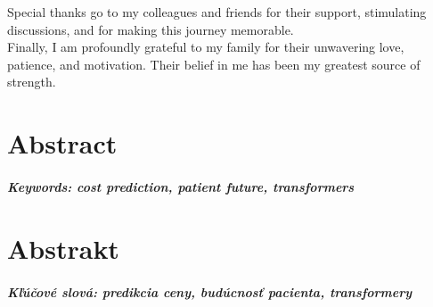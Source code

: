 \documentclass[12pt, twoside, openany]{book}
\begin{document}
Special thanks go to my colleagues and friends for their support, stimulating discussions, and for making this journey memorable.
\\

Finally, I am profoundly grateful to my family for their unwavering love, patience, and motivation. Their belief in me has been my greatest source of strength.


\vfill\eject 



\newpage 
\thispagestyle{empty}
\chapter*{Abstract}\label{chap:abstract_en}


\paragraph*{Keywords: cost prediction, patient future, transformers}  


\newpage 
\thispagestyle{empty}
\chapter*{Abstrakt}\label{chap:abstract_sk}


\paragraph*{Kľúčové slová: predikcia ceny, budúcnosť pacienta, transformery}




\newpage 
\tableofcontents



\newpage 
\listoffigures
\listoftables




\mainmatter

















\backmatter

\nocite{*}



\end{document}
